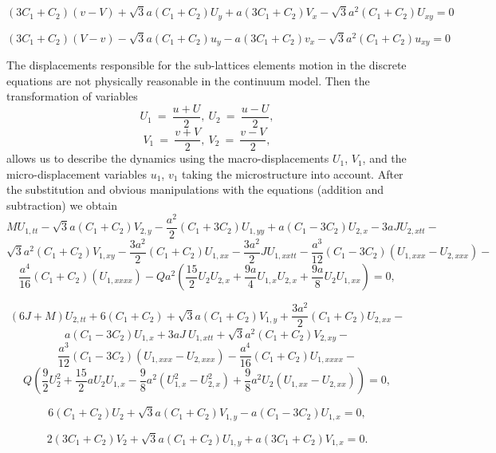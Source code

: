 \begin{equation}
	(3C_1+C_2)(v-V) + \sqrt{3}a(C_1+C_2)U_y  + a(3C_1+C_2)V_x - \sqrt{3}a^2(C_1+C_2)U_{xy} = 0
	\label{cont3}
\end{equation}

\begin{equation}
	(3C_1+C_2)(V-v) - \sqrt{3}a(C_1+C_2)u_y  - a(3C_1+C_2)v_x - \sqrt{3}a^2(C_1+C_2)u_{xy} = 0
	\label{cont4}
\end{equation}

The displacements responsible for the sub-lattices elements motion in the discrete equations are not physically reasonable in the continuum model. Then the transformation of variables 
\[
U_1~=~\frac{u+U}{2},~U_2~=~\frac{u-U}{2},
\]
\[
V_1~=~\frac{v+V}{2},~V_2~=~\frac{v-V}{2},
\]
allows us to describe the dynamics using the macro-displacements $U_1$, $V_1$, and the micro-displacement variables $u_1$, $v_1$ taking the microstructure into account. 
After the substitution and obvious manipulations with the equations (addition and subtraction) we obtain 
\[
MU_{1,tt} - \sqrt{3}a(C_1+C_2)V_{2,y} - \frac{a^2}{2}(C_1+3C_2)U_{1,yy} + a(C_1-3C_2)U_{2,x} - 3aJU_{2,xtt} - 
\]
\[
\sqrt{3}a^2(C_1+C_2)V_{1,xy} -\frac{3a^2}{2}(C_1+C_2)U_{1,xx} - \frac{3a^2}{2}JU_{1,xxtt} - \frac{a^3}{12}(C_1-3C_2)(U_{1,xxx}-U_{2,xxx}) -
\]
\begin{equation}
	\frac{a^4}{16}(C_1+C_2)(U_{1,xxxx}) -Qa^2\left(\frac{15}{2}U_2U_{2,x} + \frac{9a}{4} U_{1,x}U_{2,x} +\frac{9a}{8}U_{2}U_{1,xx} \right) =0, \label{aseq1}
\end{equation}

\[
(6J+M)U_{2,tt} + 6(C_1+C_2) +\sqrt{3}a(C_1+C_2)V_{1,y} + \frac{3a^2}{2}(C_1+C_2)U_{2,xx} - 
\]
\[
a(C_1-3C_2)U_{1,x} +3aJ~U_{1,xtt} +\sqrt{3}a^2(C_1+C_2)V_{2,xy} -
\]
\[
\frac{a^3}{12}(C_1-3C_2)(U_{1,xxx}-U_{2,xxx}) - \frac{a^4}{16}(C_1+C_2)U_{1,xxxx} -
\]
\begin{equation}
	Q\left(\frac{9}{2}U_2^2 + \frac{15}{2}a U_2 U_{1,x} - \frac{9}{8}a^2(U_{1,x}^2 - U_{2,x}^2) +\frac{9}{8} a^2U_2(U_{1,xx}-U_{2,xx})\right) =0,  \label{aseq2}
\end{equation}

\begin{equation}
	6(C_1+C_2)U_2 + \sqrt{3}a(C_1+C_2)V_{1,y} - a(C_1 - 3C_2)U_{1,x} = 0,  \label{aseq3}
\end{equation}

\begin{equation}
	2(3C_1+C_2)V_2 + \sqrt{3}a(C_1+C_2)U_{1,y} + a(3C_1 + C_2)V_{1,x} = 0.  \label{aseq4}
\end{equation}

